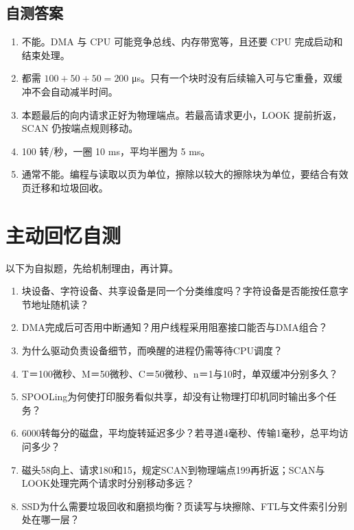 \subsection{自测答案}\label{OS05-auto-3}

\begin{enumerate}
\def\labelenumi{\arabic{enumi}.}
\tightlist
\item
  不能。DMA 与 CPU 可能竞争总线、内存带宽等，且还要 CPU 完成启动和结束处理。
\item
  都需 \(100+50+50=200\) μs。只有一个块时没有后续输入可与它重叠，双缓冲不会自动减半时间。
\item
  本题最后的向内请求正好为物理端点。若最高请求更小，LOOK 提前折返，SCAN 仍按端点规则移动。
\item
  100 转/秒，一圈 10 ms，平均半圈为 5 ms。
\item
  通常不能。编程与读取以页为单位，擦除以较大的擦除块为单位，要结合有效页迁移和垃圾回收。
\end{enumerate}

\section{主动回忆自测}\label{OS05-recall}

以下为自拟题，先给机制理由，再计算。

\begin{recallcard}[从接口职责检查到机械与闪存过程]

\begin{enumerate}
\def\labelenumi{\arabic{enumi}.}
\tightlist
\item
  块设备、字符设备、共享设备是同一个分类维度吗？字符设备是否能按任意字节地址随机读？
\item
  DMA完成后可否用中断通知？用户线程采用阻塞接口能否与DMA组合？
\item
  为什么驱动负责设备细节，而唤醒的进程仍需等待CPU调度？
\item
  T＝100微秒、M＝50微秒、C＝50微秒、n＝1与10时，单双缓冲分别多久？
\item
  SPOOLing为何使打印服务看似共享，却没有让物理打印机同时输出多个任务？
\item
  6000转每分的磁盘，平均旋转延迟多少？若寻道4毫秒、传输1毫秒，总平均访问多少？
\item
  磁头58向上、请求180和15，规定SCAN到物理端点199再折返；SCAN与LOOK处理完两个请求时分别移动多远？
\item
  SSD为什么需要垃圾回收和磨损均衡？页读写与块擦除、FTL与文件索引分别处在哪一层？
\end{enumerate}

\end{recallcard}

